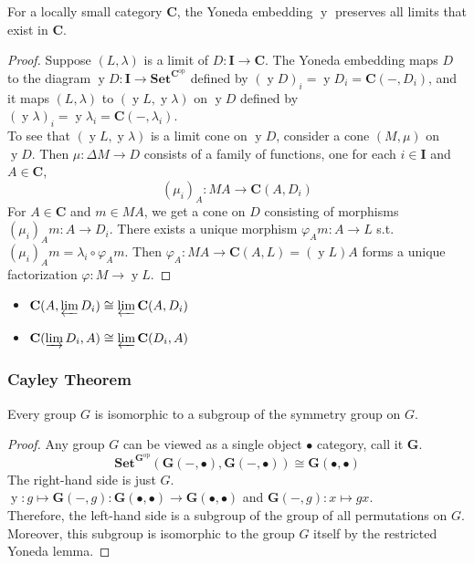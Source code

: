 \documentclass[UTF8,11pt,colorlinks,compress,openany]{beamer}%
\begin{document}
\begin{frame}\frametitle{}
\begin{theorem}
For a locally small category $\mathbf{C}$, the Yoneda embedding $\operatorname{y}$
preserves all limits that exist in $\mathbf{C}$.
\end{theorem}
\begin{proof}
Suppose $(L,\lambda)$ is a limit of $D:\mathbf{I}\to\mathbf{C}$. The Yoneda embedding maps $D$ to the diagram $\operatorname{y}D:\mathbf{I}\to\mathbf{Set}^{\mathbf{C}^\mathrm{op}}$ defined by $(\operatorname{y}D)_i=\operatorname{y}D_i=\mathbf{C}(-,D_i)$, and it maps $(L,\lambda)$ to $(\operatorname{y}L,\operatorname{y}\lambda)$ on $\operatorname{y}D$ defined by $(\operatorname{y}\lambda)_i=\operatorname{y}\lambda_i=\mathbf{C}(-,\lambda_i)$.\\
To see that $(\operatorname{y}L,\operatorname{y}\lambda)$ is a limit cone on $\operatorname{y}D$, consider a cone $(M,\mu)$ on $\operatorname{y}D$. Then $\mu:\Delta M\to D$ consists of a family of functions, one for each $i\in\mathbf{I}$ and $A\in\mathbf{C}$,
\[(\mu_i)_A: MA\to\mathbf{C}(A,D_i)\]
For $A\in\mathbf{C}$ and $m\in MA$, we get a cone on $D$ consisting of morphisms $(\mu_i)_Am: A\to D_i$. There exists a unique morphism $\varphi_Am: A\to L$ s.t. $(\mu_i)_Am=\lambda_i\circ\varphi_Am$. Then $\varphi_A: MA\to \mathbf{C}(A,L)=(\operatorname{y}L)A$ forms a unique factorization $\varphi: M\to\operatorname{y}L$.
\end{proof}
\begin{itemize}
	\item $\mathbf{C}(A,\varprojlim D_i)\cong\varprojlim\mathbf{C}(A,D_i)$
	\item $\mathbf{C}(\varinjlim D_i,A)\cong\varprojlim\mathbf{C}(D_i,A)$
\end{itemize}
\end{frame}

\begin{frame}\frametitle{Cayley Theorem}
\begin{theorem}
Every group $G$ is isomorphic to a subgroup of the symmetry group on $G$.
\end{theorem}
\begin{proof}
Any group $G$ can be viewed as a single object $\bullet$ category, call it $\mathbf{G}$.
\[\mathbf{Set}^{\mathbf{G}^\mathrm{op}}(\mathbf{G}(-,\bullet),\mathbf{G}(-,\bullet))\cong\mathbf{G}(\bullet,\bullet)\]
The right-hand side is just $G$.\\
$\operatorname{y}: g\mapsto\mathbf{G}(-,g):\mathbf{G}(\bullet,\bullet)\to\mathbf{G}(\bullet,\bullet)$ and $\mathbf{G}(-,g): x\mapsto gx$.\\
Therefore, the left-hand side is a subgroup of the group of all permutations on $G$.\\
Moreover, this subgroup is isomorphic to the group $G$ itself by the restricted Yoneda lemma.
\end{proof}
\end{frame}
\end{document}

